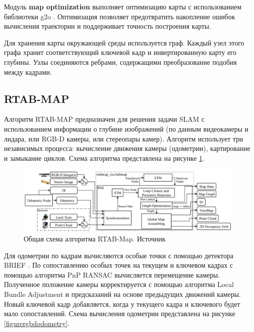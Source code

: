\documentclass{mipt-thesis-ms}
\begin{document}
	Модуль \textbf{map optimization} выполняет оптимизацию карты с использованием библиотеки g2o \cite{grisetti2011g2o}. Оптимизация позволяет предотвратить накопление ошибок вычисления траектории и поддерживает точность построения карты.
	
	Для хранения карты окружающей среды используется граф. Каждый узел этого графа хранит соответствующий ключевой кадр и инвертированную карту его глубины. Узлы соединяются ребрами, содержащими преобразование подобия между кадрами.
	
	\subsection{RTAB-MAP}
	\label{section_rtabmap}
	
	Алгоритм RTAB-MAP \cite{labbe2019rtab} предназначен для решения задачи SLAM с использованием информации о глубине изображений (по данным видеокамеры и лидара, или RGB-D камеры, или стереопары камер). Алгоритм использует три независимых процесса: вычисление движения камеры (одометрии), картирование и замыкание циклов. Схема алгоритма представлена на рисунке \ref{figurertabmap}.
	
	\begin{figure}
		\centering
		\includegraphics[scale=0.4]{img/rtabmap_scheme.png}
		\caption{Общая схема алгоритма RTAB-Map. Источник \cite{labbe2019rtab}}
		\label{figurertabmap}
	\end{figure}
	
	Для одометрии по кадрам вычисляются особые точки с помощью детектора BRIEF \cite{calonder2010brief}. По сопоставлению особых точек на текущем и ключевом кадрах с помощью алгоритма PnP RANSAC \cite{brachmann2017dsac} вычисляется перемещение камеры. Полученное положение камеры корректируется с помощью алгоритма Local Bundle Adjustment \cite{zhang2006incremental} и предсказаний на основе предыдущих движений камеры. Новый ключевой кадр добавляется, когда у текущего кадра и ключевого будет мало сопоставлений. Схема вычисления одометрии представлена на рисунке \ref{figurergbdodometry}.
	
\end{document}
